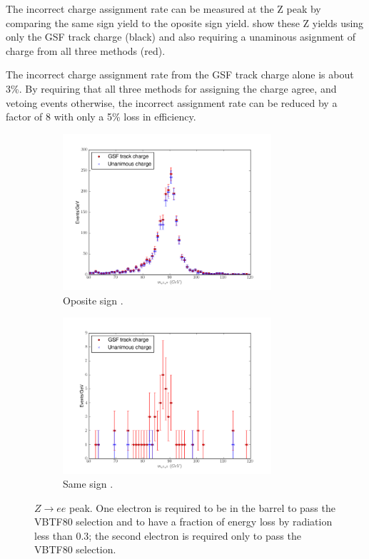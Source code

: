 The incorrect charge assignment rate can be measured at the Z peak by comparing the same
sign \HepProcess{\PZ\to\Pepm\Pepm} yield to the oposite sign
\HepProcess{\PZ\to\Pepm\Pemp} yield.  show these Z yields
using only the \ac{GSF} track charge (black) and also requiring a unaminous
asignment of charge from all three methods (red). 

The incorrect charge assignment rate from the GSF track charge alone is about
\unit{3}{\%}.  By requiring that all three methods for assigning the charge
agree, and vetoing events otherwise, the incorrect assignment rate can be
reduced by a factor of 8 with only a \unit{5}{\%} loss in efficiency.

\begin{figure}[htbp]
  \centering
  \begin{subfigure}{\textwidth}
    \centering
    \includegraphics[width=0.85\textwidth]{zpeak_os}
    \caption{Oposite sign \PZ.}
    \label{fig:zpeak_os}
  \end{subfigure}
  \begin{subfigure}{\textwidth}
    \centering
    \includegraphics[width=0.85\textwidth]{zpeak_ss}
    \caption{Same sign \PZ.}
    \label{fig:zpeak_ss}
  \end{subfigure}
  \caption{ $Z\rightarrow ee$ peak. One electron is required to be in the
barrel to pass the VBTF80 selection and to have a fraction of energy loss by
radiation less than 0.3; the second electron is required only to pass the VBTF80
selection.}\label{fig:zpeak} 
\end{figure}

